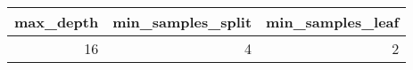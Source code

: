 \begin{tabular}{rrr}
\toprule
max_depth & min_samples_split & min_samples_leaf \\
\midrule
16 & 4 & 2 \\
\bottomrule
\end{tabular}
